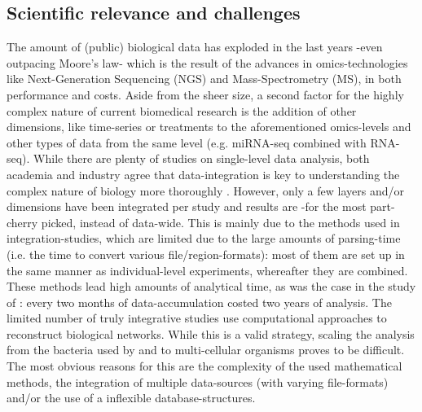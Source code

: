\documentclass[twoside,fontsize=10pt]{article}
\begin{document}
\subsection*{Scientific relevance and challenges} %
The amount of (public) biological data has exploded in the last years -even outpacing Moore's law- which is the result of the advances in omics-technologies like Next-Generation Sequencing (NGS) and Mass-Spectrometry (MS), in both performance and costs. Aside from the sheer size, a second factor for the highly complex nature of current biomedical research is the addition of other dimensions, like time-series or treatments to the aforementioned omics-levels and other types of data from the same level (e.g. miRNA-seq combined with RNA-seq). While there are plenty of studies on single-level data analysis, both academia and industry agree that data-integration is key to understanding the complex nature of biology more thoroughly \citep{Gomez-Cabrero2014, Huttenhower2010, Searls2005, Hamid2009}. However, only a few layers and/or dimensions have been integrated per study and results are -for the most part- cherry picked, instead of data-wide. This is mainly due to the methods used in integration-studies, which are limited due to the large amounts of parsing-time (i.e. the time to convert various file/region-formats): most of them are set up in the same manner as individual-level experiments, whereafter they are combined. These methods lead high amounts of analytical time, as was the case in the study of \citet{Munoz2011}: every two months of data-accumulation costed two years of analysis. The limited number of truly integrative studies use computational approaches to reconstruct biological networks. While this is a valid strategy, scaling the analysis from the bacteria used by \citet{Karr2012} and \citet{Lerman2012} to multi-cellular organisms proves to be difficult. The most obvious reasons for this are the complexity of the used mathematical methods, the integration of multiple data-sources (with varying file-formats) and/or the use of a inflexible database-structures. 
\medskip
\end{document}
